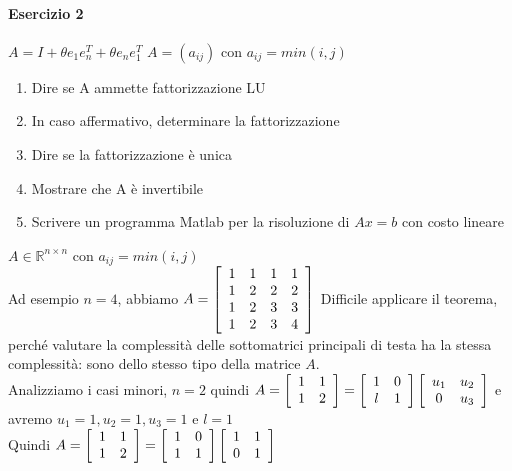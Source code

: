 \documentclass[10pt]{book}
\begin{document}
\paragraph{Esercizio 2} $A = I + \theta e_1 e_n ^T + \theta e_n e_1^T$
$A = (a_{ij})$ con $a_{ij} = min(i, j)$
\begin{enumerate}
	\item Dire se A ammette fattorizzazione LU
	\item In caso affermativo, determinare la fattorizzazione
	\item Dire se la fattorizzazione è unica
	\item Mostrare che A è invertibile
	\item Scrivere un programma Matlab per la risoluzione di $Ax = b$ con costo lineare
\end{enumerate}
$A \in \mathbb{R}^{n \times n}$ con $a_{ij} = min(i, j)$\\
Ad esempio $n = 4$, abbiamo
\begin{math}
A = \left[
\begin{array}{c c c c}
	1 & 1 & 1 & 1\\
	1 & 2 & 2 & 2\\
	1 & 2 & 3 & 3\\
	1 & 2 & 3 & 4
\end{array}
\right]
\end{math}
Difficile applicare il teorema, perché valutare la complessità delle sottomatrici principali di testa ha la stessa complessità: sono dello stesso tipo della matrice $A$.\\
Analizziamo i casi minori, $n = 2$ quindi \begin{math}
A = \left[
\begin{array}{c c}
	1 & 1\\
	1 & 2
\end{array}
\right]
= \left[
\begin{array}{c c}
	1 & 0\\
	l & 1
\end{array}
\right]
\left[
\begin{array}{c c}
	u_1 & u_2\\
	0 & u_3
\end{array}
\right]
\end{math}
e avremo $u_1 = 1, u_2 = 1, u_3 = 1$ e $l = 1$\\
Quindi \begin{math}
A = \left[
\begin{array}{c c}
	1 & 1\\
	1 & 2
\end{array}
\right]
= \left[
\begin{array}{c c}
	1 & 0\\
	1 & 1
\end{array}
\right]
\left[
\begin{array}{c c}
	1 & 1\\
	0 & 1
\end{array}
\right]
\end{math}\\
\end{document}

